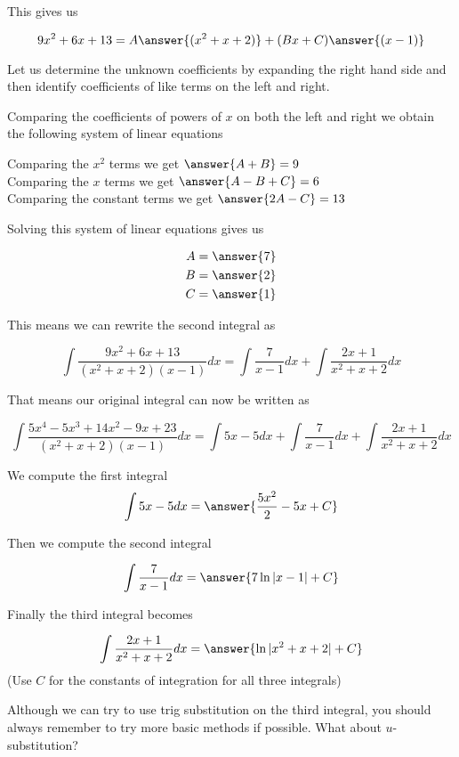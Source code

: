 \documentclass{ximera}
\begin{document}
\begin{exercise}
\begin{exercise}
\begin{exercise}
This gives us 

\[
9x^{2}+6x+13=A\answer{(x^{2}+x+2)} + (Bx+C)\answer{(x-1)}
\]

Let us determine the unknown coefficients by expanding the right hand side and then identify coefficients of like terms on the left and right.



Comparing the coefficients of powers of $x$ on both the left and right we obtain the following system of linear equations


Comparing the $x^{2}$ terms we get $\answer {A+B}=9$ \\
Comparing the $x$ terms we get $\answer{A-B+C}=6$ \\
Comparing the constant terms we get $\answer{2A-C}=13$ 

\begin{exercise}
Solving this system of linear equations gives us

\begin{align}
A&=\answer{ 7 }\\
B&=\answer{2  }\\
C&=\answer{ 1 }
\end{align}





\begin{exercise}
This means we can  rewrite the second integral as

\[
\int \frac{9x^{2}+6x+13}{(x^{2}+x+2)(x-1)} dx= \int \frac{7}{x-1} dx + \int \frac{2x+1}{x^{2}+x+2} dx
\]

 That means our original integral can now be written as 

\[
\int \frac{5x^{4}-5x^{3}+14x^{2}-9x+23}{(x^{2}+x+2)(x-1)} dx= \int 5x-5 dx + \int \frac{7}{x-1} dx +
\int \frac{2x+1}{x^{2}+x+2} dx 
\]

We compute the first integral 
\[
\int 5x-5 dx =\answer{ \frac{5x^{2}}{2} - 5x +C }
\]

Then we compute the second integral 

\[
\int \frac{7}{x-1} dx= \answer{ 7\ln|x-1|+C }
\]

Finally the third integral becomes 

\[
\int \frac{2x+1}{x^{2}+x+2} dx=\answer{ \ln| x^{2}+x+2 | + C}
\]
(Use $C$ for the constants of integration for all three integrals)

\begin{hint}
Although we can try to use trig substitution on the third integral, you should always remember to try more basic
methods if possible. What about $u$-substitution?
\end{hint}


\end{exercise}
\end{exercise}
\end{exercise}
\end{exercise}
\end{exercise}
\end{document}
